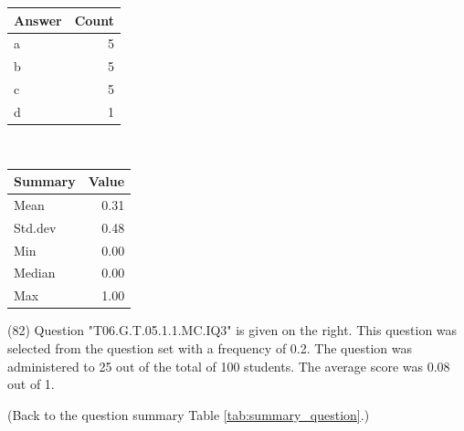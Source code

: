 \documentclass[12pt,nohyper]{tufte-handout}\usepackage[]{graphicx}\usepackage[]{color}
\begin{document}
\begin{center}%
\begin{tabular}{lr}
  \hline
Answer & Count \\ 
  \hline
a &   5 \\ 
  b &   5 \\ 
  c &   5 \\ 
  d &   1 \\ 
   \hline
\end{tabular}
~~~~~~~~%
\begin{tabular}{lr}
  \hline
Summary & Value \\ 
  \hline
Mean & 0.31 \\ 
  Std.dev & 0.48 \\ 
  Min & 0.00 \\ 
  Median & 0.00 \\ 
  Max & 1.00 \\ 
   \hline
\end{tabular}
\end{center}\newpage{} (82) Question "T06.G.T.05.1.1.MC.IQ3" is given on the right. This question was selected from the question set with a frequency of 0.2. The question was administered to 25 out of the total of 100 students. The average score was 0.08 out of 1.

 (Back to the question summary Table \ref{tab:summary_question}.)
\end{document}

